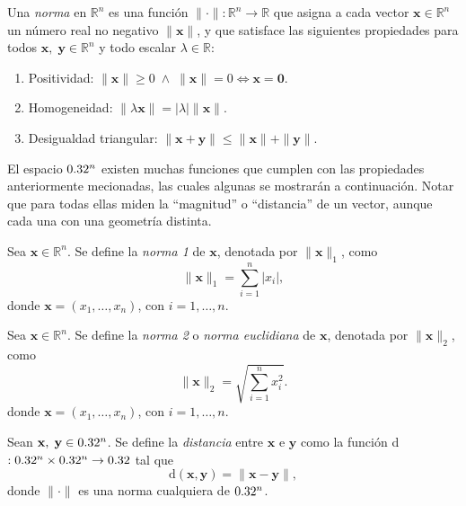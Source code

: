 \begin{definition}\label{def:norma-general}
    Una \emph{norma} en $\mathbb{R}^n$ es una función $\|\cdot\| : \mathbb{R}^n \to \mathbb{R}$ que asigna a cada vector $\mathbf{x} \in \mathbb{R}^n$ un número real no negativo $\|\mathbf{x}\|$, y que satisface las siguientes propiedades para todos $\mathbf{x},\;\mathbf{y} \in \mathbb{R}^n$ y todo escalar $\lambda \in \mathbb{R}$:
    \begin{enumerate}
        \item Positividad: $\|\mathbf{x}\| \geq 0\;\land\;\|\mathbf{x}\| = 0 \iff \mathbf{x} = \boldsymbol{0}$.
        \item Homogeneidad: $\|\lambda \mathbf{x}\| = |\lambda|\|\mathbf{x}\|$.
        \item Desigualdad triangular: $\|\mathbf{x} + \mathbf{y}\| \leq \|\mathbf{x}\| + \|\mathbf{y}\|$.
    \end{enumerate}
\end{definition}

\begin{obs}
    El espacio $0.32^n$ existen muchas funciones que cumplen con las propiedades anteriormente mecionadas, las cuales algunas se mostrar\'an a continuaci\'on. Notar que para todas ellas miden la ``magnitud'' o ``distancia'' de un vector, aunque cada una con una geometr\'ia distinta.
\end{obs}

\begin{definition}\label{def:norm1}
    Sea $\mathbf{x}\in \mathbb{R}^n$. Se define la \emph{norma 1} de $\mathbf{x}$, denotada por $\|\mathbf{x}\|_1$, como
    \[
        \|\mathbf{x}\|_1 = \sum_{i=1}^n |x_i|,
    \]
    donde $\mathbf{x}=(x_1,\ldots,x_n)$, con $i=1,\ldots,n.$
\end{definition}

\begin{definition}\label{def:norm2}
    Sea $\mathbf{x}\in \mathbb{R}^n$. Se define la \emph{norma 2} o \emph{norma euclidiana} de $\mathbf{x}$, denotada por $\|\mathbf{x}\|_2$, como
    \[
        \|\mathbf{x}\|_2 = \sqrt{ \sum_{i=1}^n x_i^2 }.
    \]
    donde $\mathbf{x}=(x_1,\ldots,x_n)$, con $i=1,\ldots,n.$
\end{definition}

\begin{definition}
    Sean $\mathbf{x},\;\mathbf{y}\in0.32^n$. Se define la \emph{distancia} entre $\mathbf{x}\text{ e }\mathbf{y}$ como la funci\'on d$:0.32^n\times0.32^n\to0.32$ tal que
    \[
        \text{d}(\mathbf{x},\mathbf{y})=\|\mathbf{x}-\mathbf{y}\|,
    \]
    donde $\|\cdot\|$ es una norma cualquiera de $0.32^n$.
\end{definition}

